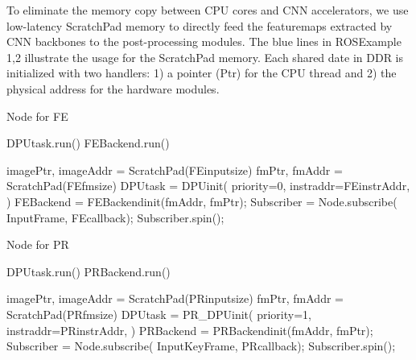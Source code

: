 To eliminate the memory copy between CPU cores and CNN accelerators, we use low-latency ScratchPad memory \cite{Banakar2002Scratchpad} to directly feed the featuremaps extracted by CNN backbones to the post-processing modules. The blue lines in  ROSExample 1,2 illustrate the usage for the ScratchPad memory. Each shared date in DDR is initialized with two handlers: 1) a pointer (Ptr) for the CPU thread and 2) the physical address for the hardware modules. 

\begin{algorithm}[h]
    \caption{ Node for FE }
    \begin{algorithmic}[1]
        \State DPUtask.run()
        \State FEBackend.run()
        \EndFunction

        \State imagePtr, imageAddr = ScratchPad(FEinputsize)
        \State fmPtr, fmAddr = ScratchPad(FEfmsize)
        \State DPUtask = DPUinit({\color{red}  priority=0},{\color{blue} instraddr=FEinstrAddr, }
        \State \qquad \qquad \qquad {} ) 
        \State FEBackend = FEBackendinit({\color{blue}fmAddr, fmPtr});
        \State Subscriber = Node.subscribe( InputFrame, FEcallback);
        \State Subscriber.spin();
        \EndFunction
    \end{algorithmic}
\end{algorithm}

\begin{algorithm}[h]
    \caption{ Node for PR }
    \begin{algorithmic}[1]
        \State DPUtask.run()
        \State PRBackend.run()
        \EndFunction

        \State imagePtr, imageAddr = ScratchPad(PRinputsize)
        \State fmPtr, fmAddr = ScratchPad(PRfmsize)
        \State DPUtask = PR\_DPUinit( {\color{red} priority=1},{\color{blue} instraddr=PRinstrAddr}, 
        \State \qquad \qquad \qquad {} ) 
        \State PRBackend = PRBackendinit({\color{blue}fmAddr, fmPtr});
        \State Subscriber = Node.subscribe( InputKeyFrame, PRcallback);
        \State Subscriber.spin();
        \EndFunction
    \end{algorithmic}
\end{algorithm}
